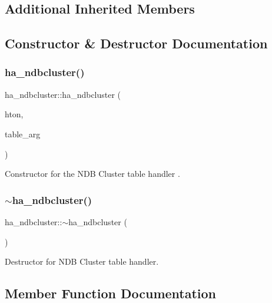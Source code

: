 \subsection*{Additional Inherited Members}


\subsection{Constructor \& Destructor Documentation}
\mbox{\label{classha__ndbcluster_a743f4c09bc748bd6d1fce84520472614}} 
\subsubsection{\texorpdfstring{ha\+\_\+ndbcluster()}{ha\_ndbcluster()}}
{\footnotesize\ttfamily ha\+\_\+ndbcluster\+::ha\+\_\+ndbcluster (\begin{DoxyParamCaption}\item[{\mbox{\hyperlink{structhandlerton}{handlerton}} $\ast$}]{hton,  }\item[{\mbox{\hyperlink{structTABLE__SHARE}{T\+A\+B\+L\+E\+\_\+\+S\+H\+A\+RE}} $\ast$}]{table\+\_\+arg }\end{DoxyParamCaption})}

Constructor for the N\+DB Cluster table handler . \mbox{\label{classha__ndbcluster_a2a0e969376e3f2d0677cd4094ae04b7e}} 
\subsubsection{\texorpdfstring{$\sim$ha\+\_\+ndbcluster()}{~ha\_ndbcluster()}}
{\footnotesize\ttfamily ha\+\_\+ndbcluster\+::$\sim$ha\+\_\+ndbcluster (\begin{DoxyParamCaption}{ }\end{DoxyParamCaption})}

Destructor for N\+DB Cluster table handler. 

\subsection{Member Function Documentation}
\mbox{\label{classha__ndbcluster_a8392198f6ff1b83f32ee480b257566a9}} 
